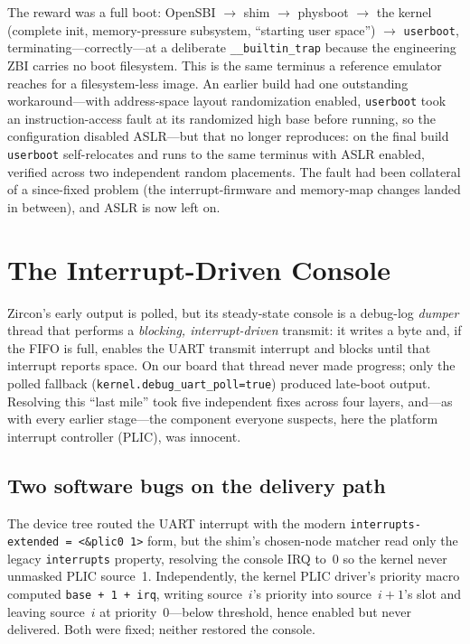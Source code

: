 \documentclass[conference,nofonttune]{IEEEtran}
\newcommand{\code}[1]{\texttt{#1}}
\begin{document}
The reward was a full boot: OpenSBI $\rightarrow$ shim $\rightarrow$ physboot
$\rightarrow$ the kernel (complete init, memory-pressure subsystem, ``starting
user space'') $\rightarrow$ \code{userboot}, terminating---correctly---at a
deliberate \code{\_\_builtin\_trap} because the engineering ZBI carries no boot
filesystem. This is the same terminus a reference emulator reaches for a
filesystem-less image. An earlier build had one outstanding workaround---with
address-space layout randomization enabled, \code{userboot} took an
instruction-access fault at its randomized high base before running, so the
configuration disabled ASLR---but that no longer reproduces: on the final build
\code{userboot} self-relocates and runs to the same terminus with ASLR enabled,
verified across two independent random placements. The fault had been collateral
of a since-fixed problem (the interrupt-firmware and memory-map changes landed in
between), and ASLR is now left on.

\section{The Interrupt-Driven Console}
\label{sec:console}

Zircon's early output is polled, but its steady-state console is a debug-log
\emph{dumper} thread that performs a \emph{blocking, interrupt-driven}
transmit: it writes a byte and, if the FIFO is full, enables the UART transmit
interrupt and blocks until that interrupt reports space. On our board that thread
never made progress; only the polled fallback
(\code{kernel.debug\_uart\_poll=true}) produced late-boot output. Resolving this
``last mile'' took five independent fixes across four layers, and---as with every
earlier stage---the component everyone suspects, here the platform interrupt
controller (PLIC), was innocent.

\subsection{Two software bugs on the delivery path}
The device tree routed the UART interrupt with the modern
\code{interrupts-extended = <\&plic0 1>} form, but the shim's chosen-node matcher
read only the legacy \code{interrupts} property, resolving the console IRQ to~0
so the kernel never unmasked PLIC source~1. Independently, the kernel PLIC
driver's priority macro computed \code{base + 1 + irq}, writing source~$i$'s
priority into source~$i{+}1$'s slot and leaving source~$i$ at priority~0---below
threshold, hence enabled but never delivered. Both were fixed; neither restored
the console.
\end{document}
